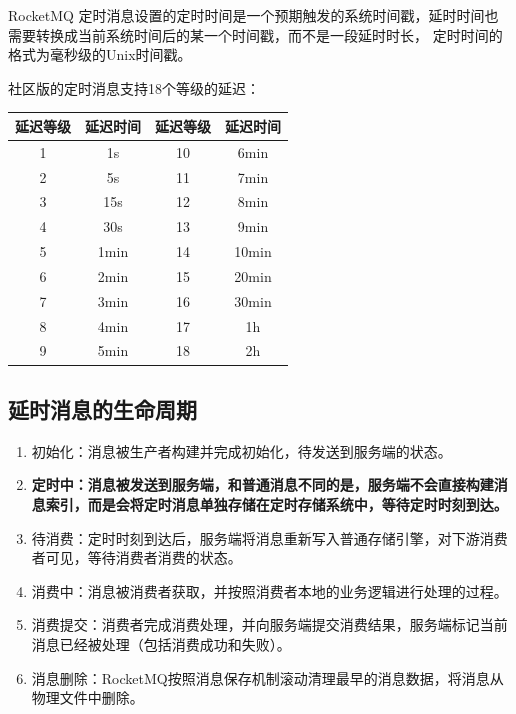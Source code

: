 \documentclass[11pt, a4paper, oneside, fontset=none]{ctexbook}
\begin{document}
RocketMQ 定时消息设置的定时时间是一个预期触发的系统时间戳，延时时间也需要转换成当前系统时间后的某一个时间戳，而不是一段延时时长，
定时时间的格式为毫秒级的Unix时间戳。

社区版的定时消息支持18个等级的延迟：
\begin{center}
  \begin{minipage}{\textwidth}
    \centering %
    \begin{tabular}{|c|c|c|c|} %
      \hline %
      \textbf{延迟等级} & \textbf{延迟时间} & \textbf{延迟等级} & \textbf{延迟时间} \\
      \hline
      1 & 1s & 10 & 6min \\
      2 & 5s & 11 & 7min \\
      3 & 15s & 12 & 8min \\
      4 & 30s & 13 & 9min \\
      5 & 1min & 14 & 10min \\
      6 & 2min & 15 & 20min \\
      7 & 3min & 16 & 30min \\
      8 & 4min & 17 & 1h \\
      9 & 5min & 18 & 2h \\
      \hline
    \end{tabular}
    \captionsetup{hypcap=false}
    \label{tab:18个等级的延迟} %
  \end{minipage}
\end{center}

\subsection{延时消息的生命周期}
\begin{enumerate}
  \item 初始化：消息被生产者构建并完成初始化，待发送到服务端的状态。
  \item {\bfseries\kaishu 定时中：消息被发送到服务端，和普通消息不同的是，服务端不会直接构建消息索引，而是会将定时消息单独存储在定时存储系统中，等待定时时刻到达。}
  \item 待消费：定时时刻到达后，服务端将消息重新写入普通存储引擎，对下游消费者可见，等待消费者消费的状态。
  \item 消费中：消息被消费者获取，并按照消费者本地的业务逻辑进行处理的过程。
  \item 消费提交：消费者完成消费处理，并向服务端提交消费结果，服务端标记当前消息已经被处理（包括消费成功和失败）。
  \item 消息删除：RocketMQ按照消息保存机制滚动清理最早的消息数据，将消息从物理文件中删除。
\end{enumerate}
\end{document}
